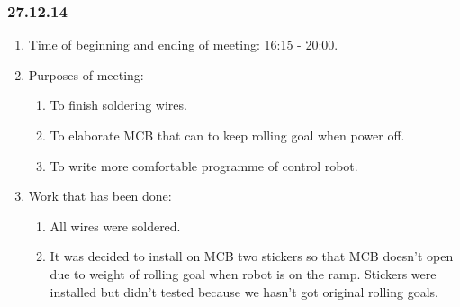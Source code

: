 \subsubsection{27.12.14}
\begin{enumerate}
	
	\item Time of beginning and ending of meeting: 16:15 - 20:00.
	
	\item Purposes of meeting: 
	\begin{enumerate}
		
		\item To finish soldering wires.
		
		\item To elaborate MCB that can to keep rolling goal when power off.
		
        \item To write more comfortable programme of control robot.
		
	\end{enumerate}

	\item Work that has been done:
	\begin{enumerate}
		
		\item All wires were soldered.
		
		\item It was decided to install on MCB two stickers so that MCB doesn't open due to weight of rolling goal when robot is on the ramp. Stickers were installed but didn't tested because we hasn't got original rolling goals.
		

\end{enumerate}
\end{enumerate}
